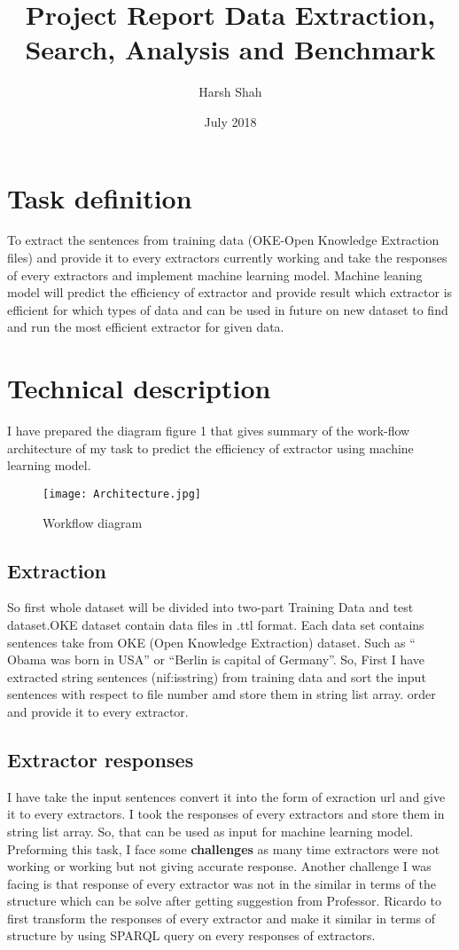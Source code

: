 \documentclass{llncs}
\title{Project Report Data Extraction, Search, Analysis and Benchmark}
\author{Harsh Shah}
\institute{Paderborn University}
\date{July 2018}
\begin{document}
\maketitle              %


\section{Task definition}
To extract the sentences from training data (OKE-Open Knowledge Extraction files) and provide it to every extractors currently working and take the responses of every extractors and implement machine learning model. Machine leaning model will predict the efficiency of extractor and provide result which extractor is efficient for which types of  data and can be used in future on new dataset to find and run the most efficient  extractor for given data.\\
 




\section{Technical description}
I have prepared the diagram figure 1 that gives  summary of the work-flow architecture of my task to predict the efficiency of extractor using machine learning model.
\begin{figure}
\texttt{[image: Architecture.jpg]}
\caption{Workflow diagram} 
\label{figure 1:}
\end{figure}

\subsection{Extraction}
So first whole dataset will be divided  into two-part Training Data and test dataset.OKE dataset contain data files in .ttl format. Each data set contains sentences take from OKE (Open Knowledge Extraction) dataset. Such as “ Obama was born in USA” or “Berlin is capital of Germany”. So, First I have extracted string sentences (nif:isstring) from training data and sort the input sentences with respect to file number amd store them in string list array. order and provide it to every extractor.


\subsection{Extractor responses }
I have take the input sentences convert it into the form of exraction url and give it to every extractors. I took the responses of every extractors and store them in string list array. So, that can be used as input for machine learning model. Preforming this task, I face some  \textbf{challenges} as many time extractors were not working or working but not giving accurate response. Another challenge I was facing is that response of every extractor was not in the similar in terms of the structure which can be solve after getting suggestion from Professor. Ricardo to first transform the responses of every extractor and make it similar in terms of structure by using SPARQL query on every responses of extractors.
\end{document}
